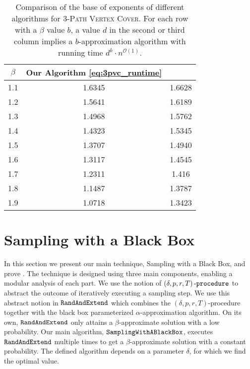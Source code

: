 \documentclass[letterpaper,11pt]{article}
\newcommand{\1}[1]{\mathds{1}\left[#1\right]}
\newcommand{\randext}{\textnormal{\texttt{RandAndExtend}}}
\newcommand{\iterrandext}{\textnormal{\texttt{SamplingWithABlackBox}}}
\newcommand{\Oh}{\mathcal{O}}
\newcommand{\procext}[4]{\left( #1, #2, #3, #4 \right)\textnormal{-\texttt{procedure}}}
\newcommand{\pathvc}[1]{\ensuremath{#1}\textsc{-Path Vertex Cover}\xspace}
\begin{document}
\begin{table}[h]
    \centering
    \begin{tabular}{|c|c|c|}
        \hline
	$\beta$ & Our Algorithm \eqref{eq:3pvc_runtime} & \cite{Fellows2018} \\
        \hline
	1.1 & 1.6345 & 1.6628 \\
        \hline
	1.2 & 1.5641 & 1.6189 \\
        \hline
        1.3 & 1.4968 & 1.5762 \\
        \hline
        1.4 & 1.4323 & 1.5345 \\
        \hline
        1.5 & 1.3707 & 1.4940 \\
        \hline
        1.6 & 1.3117 & 1.4545 \\
        \hline
        1.7 & 1.2311 & 1.416\\
        \hline
        1.8 & 1.1487 & 1.3787 \\
        \hline
        1.9 & 1.0718 & 1.3423\\
        \hline
    \end{tabular}
    \caption{Comparison of the base of exponents of different algorithms for \pathvc{3}.
 	   For each row with a $\beta$ value $b$, a value $d$ in the second or third column
	implies a $b$-approximation algorithm with running time $d^{k} \cdot n^{\Oh(1)}$.}    
    \label{tab:3pvc}
\end{table}


 

 
\section{Sampling with a Black Box}
\label{sec:algorithms}




In this section we present our main technique, Sampling with a Black Box, and prove .
The technique is designed using three main components, enabling a modular analysis of each part. We use the notion of $\procext{\delta}{p}{r}{T}$ to abstract the outcome of iteratively  executing a sampling step. We use this abstract notion in $\randext$ which combines the $(\delta,p,r,T)$-procedure together with the black box parameterized $\alpha$-approximation algorithm.  On  its own, $\randext$ only attains a $\beta$-approximate solution with a low probability. Our main algorithm, $\iterrandext$, executes $\randext$ multiple times to get  a $\beta$-approximate solution with a constant  probability. The defined algorithm  depends on a parameter $\delta$, for which we find the optimal value. 
\end{document}
